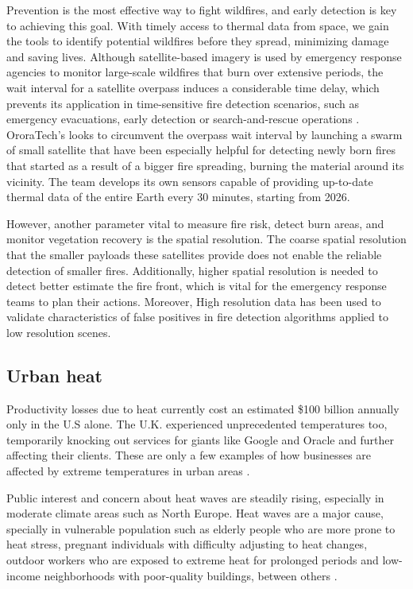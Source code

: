     Prevention is the most effective way to fight wildfires, and early detection is key to achieving this goal. 
    With timely access to thermal data from space, we gain the tools to identify potential wildfires before they spread, minimizing damage and saving lives.
    Although satellite-based imagery is used by emergency response agencies to monitor large-scale wildfires that burn over extensive periods, the wait interval for a satellite overpass induces a considerable time delay, which prevents its application in time-sensitive fire detection scenarios, such as emergency evacuations, early detection or search-and-rescue operations \cite{lippitt2015time}. 
    OroraTech's looks to circumvent the overpass wait interval by launching a swarm of small satellite that have  been especially helpful for detecting newly born fires that started as a result of a bigger fire spreading, burning the material around its vicinity. The team develops its own sensors capable of providing up-to-date thermal data of the entire Earth every 30 minutes, starting from 2026.
    
    However, another parameter vital to measure fire risk, detect burn areas, and monitor vegetation recovery is the spatial resolution. The coarse spatial resolution that the smaller payloads these satellites provide does not enable the reliable detection of smaller fires. Additionally, higher spatial resolution is needed to detect better estimate the fire front, which is vital for the emergency response teams to plan their actions.
    Moreover, High resolution data has been used to validate characteristics of false positives in fire detection algorithms applied to low resolution scenes\cite{ijgi11120601}. 



    \subsection{Urban heat}

    Productivity losses due to heat currently cost an estimated \$100 billion annually only in the U.S alone.
    The U.K. experienced unprecedented temperatures too, temporarily knocking out services for giants like Google and Oracle and further affecting their clients.
    These are only a few examples of how businesses are affected by extreme temperatures in urban areas \cite{atlanticcouncil2021extreme}.  

    Public interest and concern about heat waves are steadily rising, especially in moderate climate areas such as North Europe. Heat waves are a major cause, specially in vulnerable population such as elderly people who are more prone to heat stress, pregnant individuals with difficulty adjusting to heat changes, outdoor workers who are exposed to extreme heat for prolonged periods and low-income neighborhoods with poor-quality buildings, between others \cite{Hsu2021Disproportionate}.   

